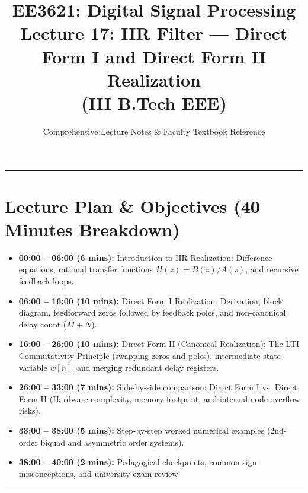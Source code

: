 \documentclass[11pt,a4paper]{article}
\title{\textbf{EE3621: Digital Signal Processing} \\ \Large Lecture 17: IIR Filter — Direct Form I and Direct Form II Realization \\ \large (III B.Tech EEE)}
\author{Comprehensive Lecture Notes \& Faculty Textbook Reference}
\date{}
\begin{document}
\maketitle

\noindent\rule{\textwidth}{0.5pt}

\section{Lecture Plan \& Objectives (40 Minutes Breakdown)}
\begin{itemize}
    \item \textbf{00:00 -- 06:00 (6 mins):} Introduction to IIR Realization: Difference equations, rational transfer functions $H(z) = B(z)/A(z)$, and recursive feedback loops.
    \item \textbf{06:00 -- 16:00 (10 mins):} Direct Form I Realization: Derivation, block diagram, feedforward zeros followed by feedback poles, and non-canonical delay count ($M+N$).
    \item \textbf{16:00 -- 26:00 (10 mins):} Direct Form II (Canonical Realization): The LTI Commutativity Principle (swapping zeros and poles), intermediate state variable $w[n]$, and merging redundant delay registers.
    \item \textbf{26:00 -- 33:00 (7 mins):} Side-by-side comparison: Direct Form I vs. Direct Form II (Hardware complexity, memory footprint, and internal node overflow risks).
    \item \textbf{33:00 -- 38:00 (5 mins):} Step-by-step worked numerical examples (2nd-order biquad and asymmetric order systems).
    \item \textbf{38:00 -- 40:00 (2 mins):} Pedagogical checkpoints, common sign misconceptions, and university exam review.
\end{itemize}

\noindent\rule{\textwidth}{0.5pt}
\end{document}
